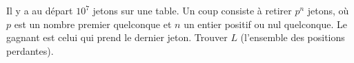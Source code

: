 Il y a au départ $10^7$ jetons sur une table. Un coup consiste à retirer $p^n$ jetons, où $p$ est un nombre premier quelconque et $n$ un entier positif ou nul quelconque. Le gagnant est celui qui prend le dernier jeton. Trouver $L$ (l'ensemble des positions perdantes).
